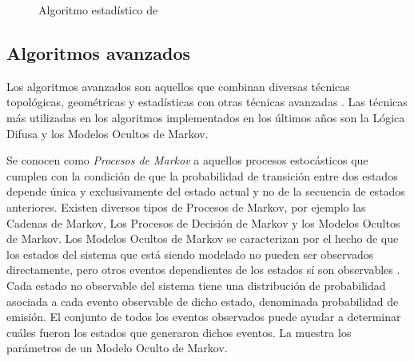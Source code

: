 \begin{figure}[h]
\centering
\begin{singlespace}
\end{singlespace}
\caption{Algoritmo estadístico de \cite{ochieng2009map}}
\label{fig:algoritmo-estadistico} 
\end{figure}

\subsection{Algoritmos avanzados}

Los algoritmos avanzados son aquellos que combinan diversas técnicas topológicas, geométricas y estadísticas con otras técnicas avanzadas \cite{quddus2007current}. Las técnicas más utilizadas en los algoritmos implementados en los últimos años son la Lógica Difusa y los Modelos Ocultos de Markov.

Se conocen como \emph{Procesos de Markov} a aquellos procesos estocásticos que cumplen con la condición de que la probabilidad de transición entre dos estados depende única y exclusivamente del estado actual y no de la secuencia de estados anteriores. Existen diversos tipos de Procesos de Markov, por ejemplo las Cadenas de Markov, Los Procesos de Decisión de Markov y los Modelos Ocultos de Markov. Los Modelos Ocultos de Markov se caracterizan por el hecho de que los estados del sistema que está siendo modelado no pueden ser observados directamente, pero otros eventos dependientes de los estados sí son observables \cite{blunsom2004hidden}. Cada estado no observable del sistema tiene una distribución de probabilidad asociada a cada evento observable de dicho estado, denominada probabilidad de emisión. El conjunto de todos los eventos observados puede ayudar a determinar cuáles fueron los estados que generaron dichos eventos. La  muestra los parámetros de un Modelo Oculto de Markov.

